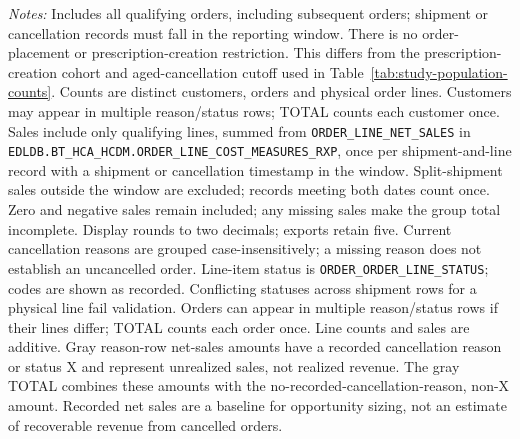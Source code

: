 \begin{table}[htbp]
\begin{minipage}{\linewidth}
\footnotesize
\textit{Notes:} Includes all qualifying orders, including subsequent orders;
shipment or cancellation records must fall in the reporting window. There is no order-placement or prescription-creation restriction.
This differs from the prescription-creation cohort and aged-cancellation cutoff
used in Table~\ref{tab:study-population-counts}.
Counts are distinct customers, orders and physical order lines. Customers may
appear in multiple reason/status rows; TOTAL counts each customer once. Sales include only
qualifying lines, summed from \texttt{ORDER\_LINE\_NET\_SALES} in
\texttt{EDLDB.BT\_HCA\_HCDM.ORDER\_LINE\_COST\_MEASURES\_RXP},
once per shipment-and-line record with a shipment or cancellation timestamp in the window. Split-shipment sales outside the window are excluded; records meeting both dates count once. Zero and negative sales remain included;
any missing sales make the group total incomplete. Display rounds to two
decimals; exports retain five. Current cancellation reasons are grouped
case-insensitively; a missing reason does not establish an uncancelled order.
Line-item status is \texttt{ORDER\_ORDER\_LINE\_STATUS}; codes are shown as recorded.
Conflicting statuses across shipment rows for a physical line fail validation.
Orders can appear in multiple reason/status rows if their lines differ;
TOTAL counts each order once. Line counts and sales are additive.
Gray reason-row net-sales amounts have a recorded cancellation reason or status X and represent
unrealized sales, not realized revenue. The gray TOTAL combines these amounts
with the no-recorded-cancellation-reason, non-X amount.
Recorded net sales are a baseline for opportunity sizing, not an estimate of
recoverable revenue from cancelled orders.
\end{minipage}
\end{table}





